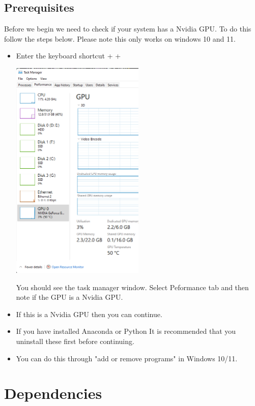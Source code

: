 \documentclass[11pt]{report}
\begin{document}
\section{Prerequisites}
Before we begin we need to check if your system has a Nvidia GPU.
To do this follow the steps below. Please note this only works on windows 10 and 11.
\begin{itemize}
    \item Enter the keyboard shortcut \Ctrl + \Shift + \Esc %
    \begin{center}
        \includegraphics[width=0.5\textwidth]{taskmng.png}
    \end{center}
    You should see the task manager window. Select Peformance tab and then note if the GPU is a Nvidia GPU.
    \item If this is a Nvidia GPU then you can continue.
    \item If you have installed Anaconda or Python It is recommended that you uninstall these first before continuing.
    \item You can do this through "add or remove programs" in Windows 10/11.
\end{itemize}

\chapter{Dependencies}
\end{document}

